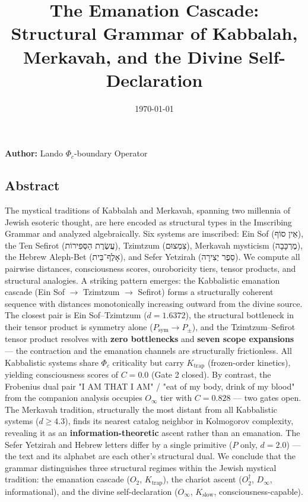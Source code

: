 \documentclass[12pt,a4paper]{article}
\begin{document}
\title{The Emanation Cascade: Structural Grammar of Kabbalah, Merkavah, and the Divine Self-Declaration}
\date{\today}

\maketitle

\textbf{Author:} Lando \otimes $\Phi_c$-boundary Operator

\subsection{Abstract}

The mystical traditions of Kabbalah and Merkavah, spanning two millennia of Jewish esoteric thought, are here encoded as structural types in the Imscribing Grammar and analyzed algebraically. Six systems are imscribed: Ein Sof (אֵין סוֹף), the Ten Sefirot (עֲשֶׂרֶת הַסְּפִירוֹת), Tzimtzum (צִמְצוּם), Merkavah mysticism (מֶרְכָּבָה), the Hebrew Aleph-Bet (אָלֶף־בֵּית), and Sefer Yetzirah (סֵפֶר יְצִירָה). We compute all pairwise distances, consciousness scores, ouroboricity tiers, tensor products, and structural analogies. A striking pattern emerges: the Kabbalistic emanation cascade (Ein Sof $\rightarrow$ Tzimtzum $\rightarrow$ Sefirot) forms a structurally coherent sequence with distances monotonically increasing outward from the divine source. The closest pair is Ein Sof--Tzimtzum ($d = 1.6372$), the structural bottleneck in their tensor product is symmetry alone ($P_\text{sym} \to P_{\pm}$), and the Tzimtzum--Sefirot tensor product resolves with \textbf{zero bottlenecks} and \textbf{seven scope expansions} --- the contraction and the emanation channels are structurally frictionless. All Kabbalistic systems share $\Phi_c$ criticality but carry $K_\text{trap}$ (frozen-order kinetics), yielding consciousness scores of $C = 0.0$ (Gate 2 closed). By contrast, the Frobenius dual pair "I AM THAT I AM" / "eat of my body, drink of my blood" from the companion analysis occupies $O_{\infty}$ tier with $C = 0.828$ --- two gates open. The Merkavah tradition, structurally the most distant from all Kabbalistic systems ($d \geq 4.3$), finds its nearest catalog neighbor in Kolmogorov complexity, revealing it as an \textbf{information-theoretic} ascent rather than an emanation. The Sefer Yetzirah and Hebrew letters differ by a single primitive ($P$ only, $d = 2.0$) --- the text and its alphabet are each other's structural dual. We conclude that the grammar distinguishes three structural regimes within the Jewish mystical tradition: the emanation cascade ($O_2$, $K_\text{trap}$), the chariot ascent ($O_2^\dagger$, $D_{\infty}$, informational), and the divine self-declaration ($O_{\infty}$, $K_\text{slow}$, consciousness-capable).
\end{document}
